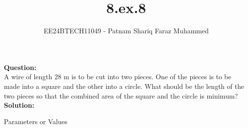 \documentclass[journal]{IEEEtran}
\numberwithin{equation}{enumi}
\numberwithin{figure}{enumi}
\begin{document}


\title{8.ex.8}
\author{EE24BTECH11049 - Patnam Shariq Faraz Muhammed}

{\let\newpage\relax\maketitle}

\textbf{Question:}\\
A wire of length 28 m is to be cut into two pieces. One of the pieces is to be made into a square and the other into a circle. What should be the length of the two pieces so that the combined area of the square and the circle is minimum?\\
\textbf{Solution:}\\
\begin{table}[!ht]
    \centering
    
    \caption{Parameters or Values}
    \label{tab:my_label}
\end{table}
\end{document}
